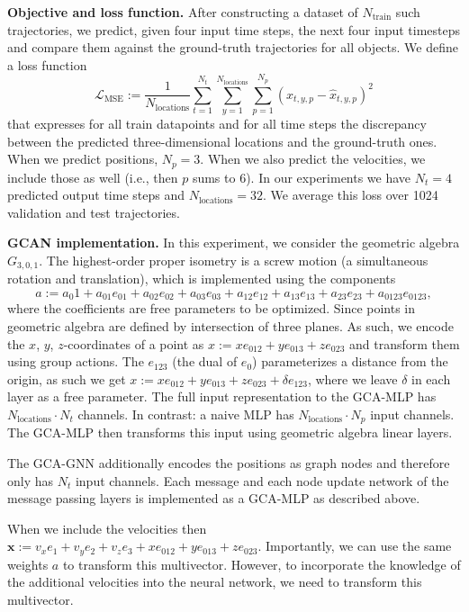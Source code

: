 \documentclass[a4paper,14pt]{article}
\theoremstyle{plain} %
\theoremstyle{definition} %
\theoremstyle{remark} %
\theoremstyle{definition}
\theoremstyle{remark}
\theoremstyle{remark}
\begin{document}
	\textbf{Objective and loss function.} After constructing a dataset of $N_{\text{train}}$ such trajectories, we predict, given four input time steps, the next four input timesteps and compare them against the ground-truth trajectories for all objects. We define a loss function
	\[
	\mathcal{L}_{\text{MSE}} := \frac{1}{N_{\text{locations}}} \sum_{t=1}^{N_t} \sum_{y=1}^{N_{\text{locations}}} \sum_{p=1}^{N_p} \left( x_{t,y,p} - \hat{x}_{t,y,p} \right)^2
	\]
	that expresses for all train datapoints and for all time steps the discrepancy between the predicted three-dimensional locations and the ground-truth ones. When we predict positions, $N_p = 3$. When we also predict the velocities, we include those as well (i.e., then $p$ sums to 6). In our experiments we have $N_t = 4$ predicted output time steps and $N_{\text{locations}} = 32$. We average this loss over 1024 validation and test trajectories.
	
	\textbf{GCAN implementation.} In this experiment, we consider the geometric algebra $G_{3,0,1}$. The highest-order proper isometry is a screw motion (a simultaneous rotation and translation), which is implemented using the components
	\[
	a := a_0 1 + a_{01} e_{01} + a_{02} e_{02} + a_{03} e_{03} + a_{12} e_{12} + a_{13} e_{13} + a_{23} e_{23} + a_{0123} e_{0123},
	\]
	where the coefficients are free parameters to be optimized. Since points in geometric algebra are defined by intersection of three planes. As such, we encode the $x$, $y$, $z$-coordinates of a point as $x := x e_{012} + y e_{013} + z e_{023}$ and transform them using group actions. The $e_{123}$ (the dual of $e_0$) parameterizes a distance from the origin, as such we get $x := x e_{012} + y e_{013} + z e_{023} + \delta e_{123}$, where we leave $\delta$ in each layer as a free parameter. The full input representation to the GCA-MLP has $N_{\text{locations}} \cdot N_t$ channels. In contrast: a naive MLP has $N_{\text{locations}} \cdot N_p$ input channels. The GCA-MLP then transforms this input using geometric algebra linear layers.
	
	The GCA-GNN additionally encodes the positions as graph nodes and therefore only has $N_t$ input channels. Each message and each node update network of the message passing layers is implemented as a GCA-MLP as described above.
	
	When we include the velocities then $\mathbf{x} := v_x e_1 + v_y e_2 + v_z e_3 + x e_{012} + y e_{013} + z e_{023}$. Importantly, we can use the same weights $a$ to transform this multivector. However, to incorporate the knowledge of the additional velocities into the neural network, we need to transform this multivector.
	
\end{document}
